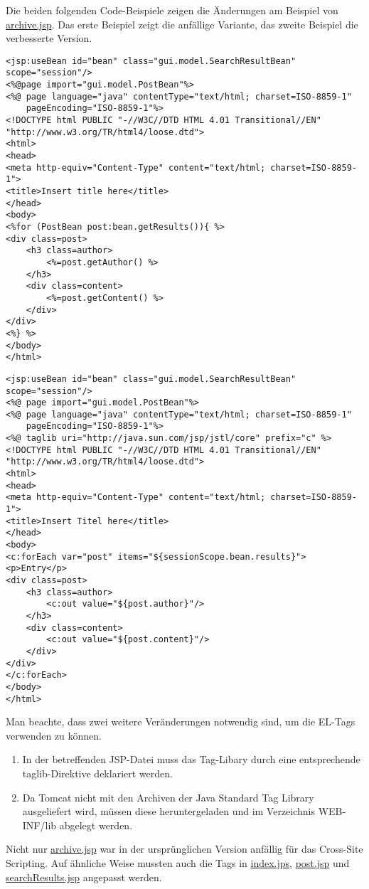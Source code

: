 Die beiden folgenden Code-Beispiele zeigen die Änderungen am Beispiel von \url{archive.jsp}. Das erste Beispiel zeigt die anfällige Variante, das zweite Beispiel die verbesserte Version.

\begin{lstlisting}
<jsp:useBean id="bean" class="gui.model.SearchResultBean" scope="session"/>
<%@page import="gui.model.PostBean"%>
<%@ page language="java" contentType="text/html; charset=ISO-8859-1"
    pageEncoding="ISO-8859-1"%>
<!DOCTYPE html PUBLIC "-//W3C//DTD HTML 4.01 Transitional//EN" "http://www.w3.org/TR/html4/loose.dtd">
<html>
<head>
<meta http-equiv="Content-Type" content="text/html; charset=ISO-8859-1">
<title>Insert title here</title>
</head>
<body>
<%for (PostBean post:bean.getResults()){ %>
<div class=post>
	<h3 class=author>
		<%=post.getAuthor() %>
	</h3>
	<div class=content>
		<%=post.getContent() %>
	</div>
</div>
<%} %>
</body>
</html>
\end{lstlisting}

\begin{lstlisting}
<jsp:useBean id="bean" class="gui.model.SearchResultBean" scope="session"/>
<%@ page import="gui.model.PostBean"%>
<%@ page language="java" contentType="text/html; charset=ISO-8859-1"
    pageEncoding="ISO-8859-1"%>
<%@ taglib uri="http://java.sun.com/jsp/jstl/core" prefix="c" %>    
<!DOCTYPE html PUBLIC "-//W3C//DTD HTML 4.01 Transitional//EN" "http://www.w3.org/TR/html4/loose.dtd">
<html>
<head>
<meta http-equiv="Content-Type" content="text/html; charset=ISO-8859-1">
<title>Insert Titel here</title>
</head>
<body>
<c:forEach var="post" items="${sessionScope.bean.results}">
<p>Entry</p>
<div class=post>
	<h3 class=author>
		<c:out value="${post.author}"/>
	</h3>
	<div class=content>
		<c:out value="${post.content}"/>
	</div>
</div>
</c:forEach>
</body>
</html>
\end{lstlisting}

Man beachte, dass zwei weitere Veränderungen notwendig sind, um die EL-Tags verwenden zu können.
\begin{enumerate}
\item In der betreffenden JSP-Datei muss das Tag-Libary durch eine entsprechende taglib-Direktive deklariert werden. 
\item Da Tomcat nicht mit den Archiven der Java Standard Tag Library ausgeliefert wird, müssen diese heruntergeladen und im Verzeichnis WEB-INF/lib abgelegt werden.
\end{enumerate}

Nicht nur \url{archive.jsp} war in der ursprünglichen Version anfällig für das Cross-Site Scripting. Auf ähnliche Weise mussten auch die Tags in \url{index.jps}, \url{post.jsp} und \url{searchResults.jsp} angepasst werden.




